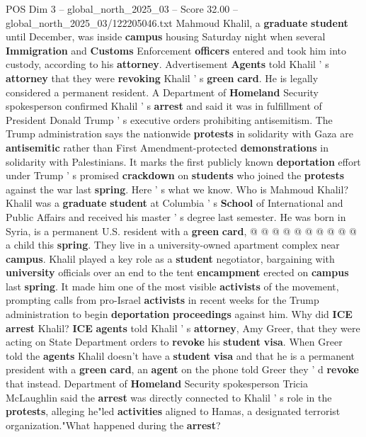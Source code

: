 \begin{textsample}{POS Dim 3 – global\_north\_2025\_03 – Score 32.00 – global\_north\_2025\_03/122205046.txt}  \label{ex:f3_pos_030}
Mahmoud Khalil, a \textbf{graduate} \textbf{student} until December, was inside \textbf{campus} housing Saturday night when several \textbf{Immigration} and \textbf{Customs} Enforcement \textbf{officers} entered and took him into custody, according to his \textbf{attorney}.
Advertisement \textbf{Agents} told Khalil ' s \textbf{attorney} that they were \textbf{revoking} Khalil ' s \textbf{green} \textbf{card}.
He is legally considered a permanent resident.
A Department of \textbf{Homeland} Security spokesperson confirmed Khalil ' s \textbf{arrest} and said it was in fulfillment of President Donald Trump ' s executive orders prohibiting antisemitism.
The Trump administration says the nationwide \textbf{protests} in solidarity with Gaza are \textbf{antisemitic} rather than First Amendment-protected \textbf{demonstrations} in solidarity with Palestinians.
It marks the first publicly known \textbf{deportation} effort under Trump ' s promised \textbf{crackdown} on \textbf{students} who joined the \textbf{protests} against the war last \textbf{spring}.
Here ' s what we know.
Who is Mahmoud Khalil?
Khalil was a \textbf{graduate} \textbf{student} at Columbia ' s \textbf{School} of International and Public Affairs and received his master ' s degree last semester.
He was born in Syria, is a permanent U.S. resident with a \textbf{green} \textbf{card}, @ @ @ @ @ @ @ @ @ @ a child this \textbf{spring}.
They live in a university-owned apartment complex near \textbf{campus}.
Khalil played a key role as a \textbf{student} negotiator, bargaining with \textbf{university} officials over an end to the tent \textbf{encampment} erected on \textbf{campus} last \textbf{spring}.
It made him one of the most visible \textbf{activists} of the movement, prompting calls from pro-Israel \textbf{activists} in recent weeks for the Trump administration to begin \textbf{deportation} \textbf{proceedings} against him.
Why did \textbf{ICE} \textbf{arrest} Khalil? \textbf{ICE} \textbf{agents} told Khalil ' s \textbf{attorney}, Amy Greer, that they were acting on State Department orders to \textbf{revoke} his \textbf{student} \textbf{visa}.
When Greer told the \textbf{agents} Khalil doesn't have a \textbf{student} \textbf{visa} and that he is a permanent president with a \textbf{green} \textbf{card}, an \textbf{agent} on the phone told Greer they ' d \textbf{revoke} that instead.
Department of \textbf{Homeland} Security spokesperson Tricia McLaughlin said the \textbf{arrest} was directly connected to Khalil ' s role in the \textbf{protests}, alleging he"led \textbf{activities} aligned to Hamas, a designated terrorist organization."What happened during the \textbf{arrest}?

\end{textsample}
